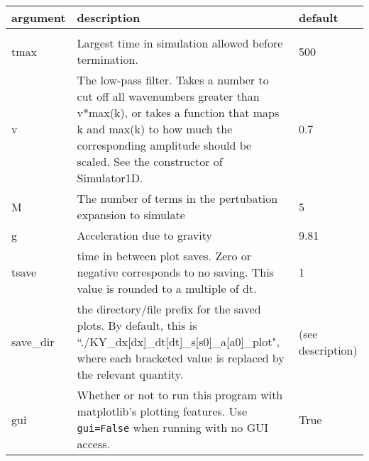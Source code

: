 \documentclass[10pt,a4paper]{article}
\newenvironment{optarglist}
    {\begin{center}
    \begin{tabular}{l|p{10cm}|l}
    argument & description & default\\
    \hline\\
    }
    { 
    \end{tabular} 
    \end{center}
    }
\begin{document}
\begin{optarglist}
    tmax      &   
           Largest time in simulation allowed before termination.&500 \\\hline

    v         & 
           The low-pass filter. Takes a number to cut off all wavenumbers
            greater than v*max(k), or takes a function that maps k and max(k)
            to how much the corresponding amplitude should be scaled. See
            the constructor of Simulator1D.& 0.7 \\\hline
    
    M           &
           The number of terms in the pertubation expansion to simulate& 5\\\hline

    g              &
           Acceleration due to gravity&9.81 \\\hline

    tsave    & 
           time in between plot saves. Zero or negative corresponds to no
            saving. This value is rounded to a multiple of dt.& 1\\\hline
    
    save\_dir     &  
           the directory/file prefix for the saved plots. By default, this is ``./KY\_dx[dx]\_dt[dt]\_s[s0]\_a[a0]\_plot", where each
bracketed value is replaced by the relevant quantity. & (see description)\\\hline

 gui &
Whether or not to run this program with matplotlib's plotting features. Use \texttt{gui=False} when running with no GUI access. & True
\end{optarglist}
\end{document}
